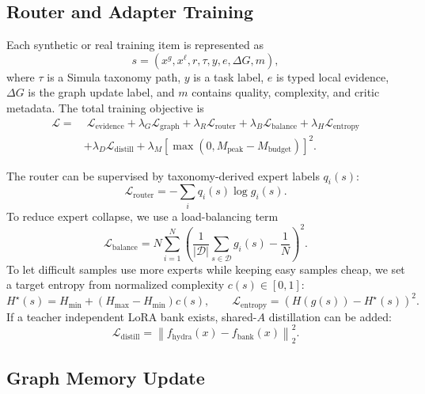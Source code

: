 \documentclass[11pt]{article}
\begin{document}
\subsection{Router and Adapter Training}

Each synthetic or real training item is represented as
\begin{equation}
  s =
  (x^g,x^\ell,r,\tau,y,e,\Delta G,m),
\end{equation}
where $\tau$ is a Simula taxonomy path, $y$ is a task label, $e$ is typed local evidence, $\Delta G$ is the graph update label, and $m$ contains quality, complexity, and critic metadata.
The total training objective is
\begin{align}
  \mathcal{L}
  =&\;
  \mathcal{L}_{\mathrm{evidence}}
  + \lambda_G \mathcal{L}_{\mathrm{graph}}
  + \lambda_R \mathcal{L}_{\mathrm{router}}
  + \lambda_B \mathcal{L}_{\mathrm{balance}}
  + \lambda_H \mathcal{L}_{\mathrm{entropy}}
  \nonumber\\
  &+
  \lambda_D \mathcal{L}_{\mathrm{distill}}
  + \lambda_M \left[\max(0,M_{\mathrm{peak}}-M_{\mathrm{budget}})\right]^2.
  \label{eq:total-loss}
\end{align}

The router can be supervised by taxonomy-derived expert labels $q_i(s)$:
\begin{equation}
  \mathcal{L}_{\mathrm{router}}
  =
  -\sum_i q_i(s)\log g_i(s).
\end{equation}
To reduce expert collapse, we use a load-balancing term
\begin{equation}
  \mathcal{L}_{\mathrm{balance}}
  =
  N\sum_{i=1}^{N}
  \left(\frac{1}{|\mathcal{D}|}\sum_{s\in\mathcal{D}}g_i(s)-\frac{1}{N}\right)^2.
\end{equation}
To let difficult samples use more experts while keeping easy samples cheap, we set a target entropy from normalized complexity $c(s)\in[0,1]$:
\begin{equation}
  H^\star(s)=H_{\min}+(H_{\max}-H_{\min})c(s),
  \qquad
  \mathcal{L}_{\mathrm{entropy}}=(H(g(s))-H^\star(s))^2.
\end{equation}
If a teacher independent LoRA bank exists, shared-$A$ distillation can be added:
\begin{equation}
  \mathcal{L}_{\mathrm{distill}}
  =
  \left\|
  f_{\mathrm{hydra}}(x)-f_{\mathrm{bank}}(x)
  \right\|_2^2.
\end{equation}

\subsection{Graph Memory Update}
\end{document}
